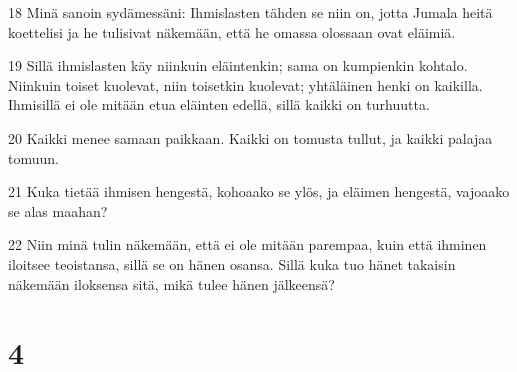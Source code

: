 \par 18 Minä sanoin sydämessäni: Ihmislasten tähden se niin on, jotta Jumala heitä koettelisi ja he tulisivat näkemään, että he omassa olossaan ovat eläimiä.
\par 19 Sillä ihmislasten käy niinkuin eläintenkin; sama on kumpienkin kohtalo. Niinkuin toiset kuolevat, niin toisetkin kuolevat; yhtäläinen henki on kaikilla. Ihmisillä ei ole mitään etua eläinten edellä, sillä kaikki on turhuutta.
\par 20 Kaikki menee samaan paikkaan. Kaikki on tomusta tullut, ja kaikki palajaa tomuun.
\par 21 Kuka tietää ihmisen hengestä, kohoaako se ylös, ja eläimen hengestä, vajoaako se alas maahan?
\par 22 Niin minä tulin näkemään, että ei ole mitään parempaa, kuin että ihminen iloitsee teoistansa, sillä se on hänen osansa. Sillä kuka tuo hänet takaisin näkemään iloksensa sitä, mikä tulee hänen jälkeensä?

\chapter{4}

